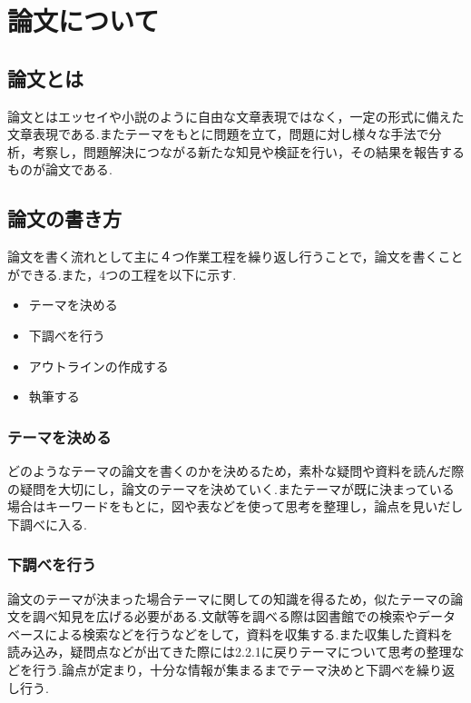 \documentclass[a4j,12pt]{jarticle}
\begin{document}
\section{論文について}
\subsection{論文とは}
論文とはエッセイや小説のように自由な文章表現ではなく，一定の形式に備えた文章表現である.またテーマをもとに問題を立て，問題に対し様々な手法で分析，考察し，問題解決につながる新たな知見や検証を行い，その結果を報告するものが論文である\cite{ren1}.

\subsection{論文の書き方}
論文を書く流れとして主に４つ作業工程を繰り返し行うことで，論文を書くことができる.また，4つの工程を以下に示す.
\begin{itemize}
  \item テーマを決める
  \item 下調べを行う
  \item アウトラインの作成する
  \item 執筆する
\end{itemize}
\subsubsection{テーマを決める}
どのようなテーマの論文を書くのかを決めるため，素朴な疑問や資料を読んだ際の疑問を大切にし，論文のテーマを決めていく.またテーマが既に決まっている場合はキーワードをもとに，図や表などを使って思考を整理し，論点を見いだし下調べに入る.

\subsubsection{下調べを行う}
論文のテーマが決まった場合テーマに関しての知識を得るため，似たテーマの論文を調べ知見を広げる必要がある.文献等を調べる際は図書館での検索やデータベースによる検索などを行うなどをして，資料を収集する.また収集した資料を読み込み，疑問点などが出てきた際には2.2.1に戻りテーマについて思考の整理などを行う.論点が定まり，十分な情報が集まるまでテーマ決めと下調べを繰り返し行う.
\end{document}
